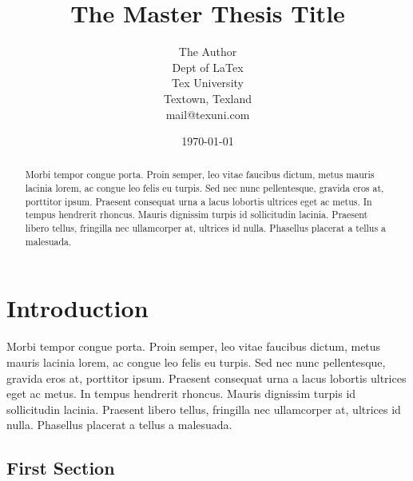 \documentclass[11pt,titlepage,twoside,openright]{report}
\title{\HUGE\textbf{The Master Thesis Title}}
\author{	\vspace{20pt}The Author\\
	Dept of LaTex\\
	Tex University\\
	Textown, Texland\\
	mail@texuni.com}
\date{\today}
\begin{document}
\setcounter{page}{1}

\maketitle
\vspace{30pt} %
\cleardoublepage

\tableofcontents
\cleardoublepage

\pagestyle{empty}
\begin{abstract}
Morbi tempor congue porta. Proin semper, leo vitae faucibus dictum, metus mauris lacinia lorem, ac congue leo felis eu turpis. Sed nec nunc pellentesque, gravida eros at, porttitor ipsum. Praesent consequat urna a lacus lobortis ultrices eget ac metus. In tempus hendrerit rhoncus. Mauris dignissim turpis id sollicitudin lacinia. Praesent libero tellus, fringilla nec ullamcorper at, ultrices id nulla. Phasellus placerat a tellus a malesuada.
\end{abstract}
\cleardoublepage

\setcounter{page}{1}
\pagestyle{fancy}


%
%

\chapter[Introduction]{Introduction}

Morbi tempor congue porta. Proin semper, leo vitae faucibus dictum, metus mauris lacinia lorem, ac congue leo felis eu turpis. Sed nec nunc pellentesque, gravida eros at, porttitor ipsum. Praesent consequat urna a lacus lobortis ultrices eget ac metus. In tempus hendrerit rhoncus. Mauris dignissim turpis id sollicitudin lacinia. Praesent libero tellus, fringilla nec ullamcorper at, ultrices id nulla. Phasellus placerat a tellus a malesuada.


\newpage

\section[1st Section Name]{First Section}
\end{document}
